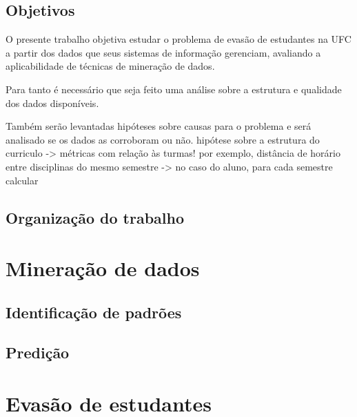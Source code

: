 \documentclass[a4paper]{article}
\begin{document}

\subsection{Objetivos}
O presente trabalho objetiva estudar o problema de evasão de estudantes na UFC a partir dos dados que seus sistemas de informação gerenciam, avaliando a aplicabilidade de técnicas de mineração de dados. 

Para tanto é necessário que seja feito uma análise sobre a estrutura e qualidade dos dados disponíveis.

Também serão levantadas hipóteses sobre causas para o problema e será analisado se os dados as corroboram ou não.
hipótese sobre a estrutura do curriculo -> métricas com relação às turmas! por exemplo, distância de horário entre disciplinas do mesmo semestre -> no caso do aluno, para cada semestre calcular

\subsection{Organização do trabalho}

\section{Mineração de dados}
\subsection{Identificação de padrões}
\subsection{Predição}
\cite{Tom_mitchell} \cite{ML_debt} \cite{ML_know}


\section{Evasão de estudantes}
\cite{EDM_pred_dropout} \cite{EDM_review_and_soa} \cite{EDM_retention} \cite{EDM_education}


\end{document}
